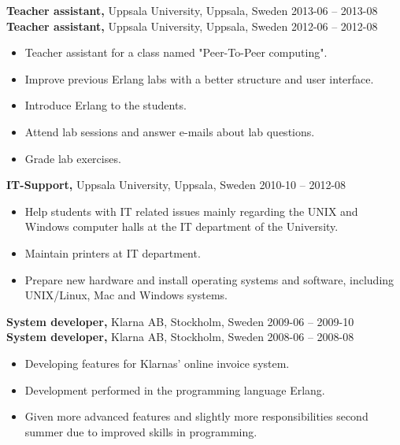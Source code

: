 \documentclass[margin]{res}
\begin{document}
\begin{resume}
{\bf Teacher assistant,} Uppsala University, Uppsala, Sweden \hfill 2013-06 -- 2013-08\\
{\bf Teacher assistant,} Uppsala University, Uppsala, Sweden \hfill 2012-06 -- 2012-08
 \begin{itemize} \itemsep -2pt  %
 \item Teacher assistant for a class named "Peer-To-Peer computing".
 \item Improve previous Erlang labs with a better structure and user interface.
 \item Introduce Erlang to the students.
 \item Attend lab sessions and answer e-mails about lab questions.
 \item Grade lab exercises.
 \end{itemize}

{\bf IT-Support,} Uppsala University, Uppsala, Sweden \hfill 2010-10 -- 2012-08
 \begin{itemize} \itemsep -2pt  %
 \item Help students with IT related issues mainly regarding the UNIX and Windows computer halls at the IT department of the University.
 \item Maintain printers at IT department.
 \item Prepare new hardware and install operating systems and software, including UNIX/Linux, Mac and Windows systems.
 \end{itemize}

{\bf System developer,} Klarna AB, Stockholm, Sweden \hfill 2009-06 -- 2009-10\\
{\bf System developer,} Klarna AB, Stockholm, Sweden \hfill 2008-06 -- 2008-08
 \begin{itemize} \itemsep -2pt  %
 \item Developing features for Klarnas' online invoice system.
 \item Development performed in the programming language Erlang.
 \item Given more advanced features and slightly more responsibilities second summer due to improved skills in programming.
 \end{itemize}

\newpage

\end{resume}
\end{document}
